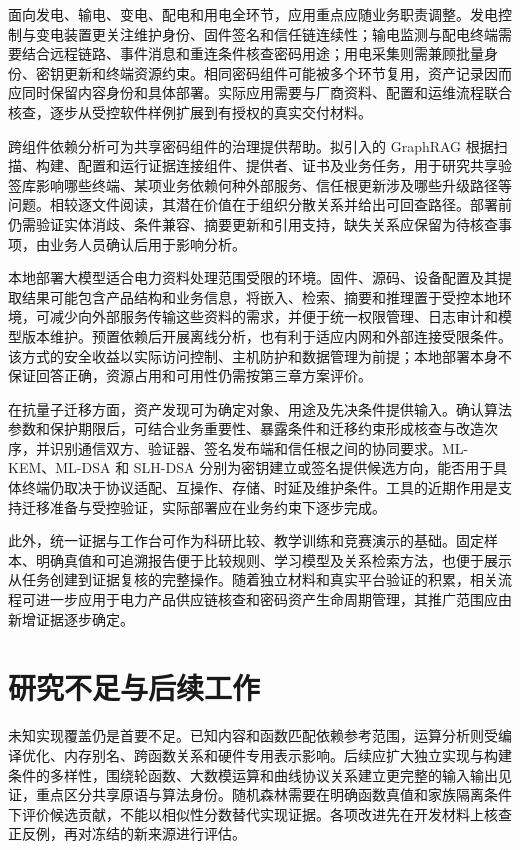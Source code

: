面向发电、输电、变电、配电和用电全环节，应用重点应随业务职责调整。发电控制与变电装置更关注维护身份、固件签名和信任链连续性；输电监测与配电终端需要结合远程链路、事件消息和重连条件核查密码用途；用电采集则需兼顾批量身份、密钥更新和终端资源约束。相同密码组件可能被多个环节复用，资产记录因而应同时保留内容身份和具体部署。实际应用需要与厂商资料、配置和运维流程联合核查，逐步从受控软件样例扩展到有授权的真实交付材料。

跨组件依赖分析可为共享密码组件的治理提供帮助。拟引入的 GraphRAG 根据扫描、构建、配置和运行证据连接组件、提供者、证书及业务任务，用于研究共享验签库影响哪些终端、某项业务依赖何种外部服务、信任根更新涉及哪些升级路径等问题\cite{graphrag2024}。相较逐文件阅读，其潜在价值在于组织分散关系并给出可回查路径。部署前仍需验证实体消歧、条件兼容、摘要更新和引用支持，缺失关系应保留为待核查事项，由业务人员确认后用于影响分析。

本地部署大模型适合电力资料处理范围受限的环境。固件、源码、设备配置及其提取结果可能包含产品结构和业务信息，将嵌入、检索、摘要和推理置于受控本地环境，可减少向外部服务传输这些资料的需求，并便于统一权限管理、日志审计和模型版本维护。预置依赖后开展离线分析，也有利于适应内网和外部连接受限条件。该方式的安全收益以实际访问控制、主机防护和数据管理为前提；本地部署本身不保证回答正确，资源占用和可用性仍需按第三章方案评价。

在抗量子迁移方面，资产发现可为确定对象、用途及先决条件提供输入。确认算法参数和保护期限后，可结合业务重要性、暴露条件和迁移约束形成核查与改造次序，并识别通信双方、验证器、签名发布端和信任根之间的协同要求。ML-KEM、ML-DSA 和 SLH-DSA 分别为密钥建立或签名提供候选方向\cite{nistfips203,nistfips204,nistfips205}，能否用于具体终端仍取决于协议适配、互操作、存储、时延及维护条件。工具的近期作用是支持迁移准备与受控验证，实际部署应在业务约束下逐步完成。

此外，统一证据与工作台可作为科研比较、教学训练和竞赛演示的基础。固定样本、明确真值和可追溯报告便于比较规则、学习模型及关系检索方法，也便于展示从任务创建到证据复核的完整操作。随着独立材料和真实平台验证的积累，相关流程可进一步应用于电力产品供应链核查和密码资产生命周期管理，其推广范围应由新增证据逐步确定。

\section{研究不足与后续工作}

未知实现覆盖仍是首要不足。已知内容和函数匹配依赖参考范围，运算分析则受编译优化、内存别名、跨函数关系和硬件专用表示影响。后续应扩大独立实现与构建条件的多样性，围绕轮函数、大数模运算和曲线协议关系建立更完整的输入输出见证，重点区分共享原语与算法身份。随机森林需要在明确函数真值和家族隔离条件下评价候选贡献，不能以相似性分数替代实现证据。各项改进先在开发材料上核查正反例，再对冻结的新来源进行评估。

